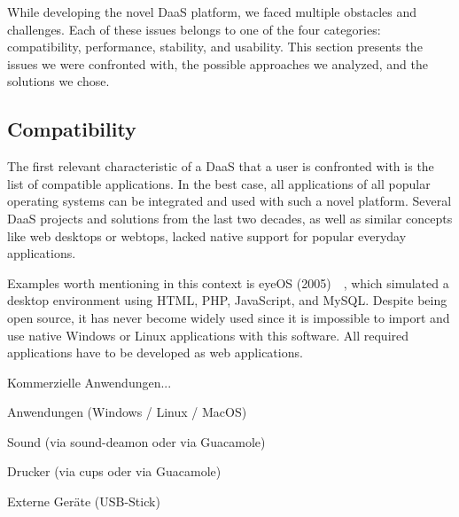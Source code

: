 \documentclass[runningheads]{llncs}
\begin{document}

While developing the novel DaaS platform, we faced multiple obstacles and challenges. Each of these issues belongs to one of the four categories: compatibility, performance, stability, and usability. This section presents the issues we were confronted with, the possible approaches we analyzed, and the solutions we chose.

\subsection{Compatibility}
% 

The first relevant characteristic of a DaaS that a user is confronted with is the list of compatible applications. In the best case, all applications of all popular operating systems can be integrated and used with such a novel platform. Several DaaS projects and solutions from the last two decades, as well as similar concepts like web desktops or webtops, lacked native support for popular everyday applications. 

Examples worth mentioning in this context is eyeOS (2005)~\cite{liu2012research}~\cite{vidyabanu2011implementation}, which simulated a desktop environment using HTML, PHP, JavaScript, and MySQL. Despite being open source, it has never become widely used since it is impossible to import and use native Windows or Linux applications with this software. All required applications have to be developed as web applications.

Kommerzielle Anwendungen...

Anwendungen (Windows / Linux / MacOS)

Sound (via sound-deamon oder via Guacamole)

Drucker (via cups oder via Guacamole)

Externe Geräte (USB-Stick)
\end{document}
